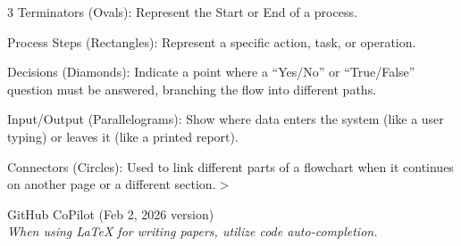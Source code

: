 \documentclass{mcmthesis}
\begin{document}
\begin{ReportAiUse}{3}
Terminators (Ovals): Represent the Start or End of a process.

Process Steps (Rectangles): Represent a specific action, task, or operation.

Decisions (Diamonds): Indicate a point where a ``Yes/No'' or ``True/False'' question must be answered, branching the flow into different paths.

Input/Output (Parallelograms): Show where data enters the system (like a user typing) or leaves it (like a printed report).

Connectors (Circles): Used to link different parts of a flowchart when it continues on another page or a different section.$>$

GitHub CoPilot (Feb 2, 2026 version)\\
\textit{When using LaTeX for writing papers, utilize code auto-completion.}
\end{ReportAiUse}
\end{document}
